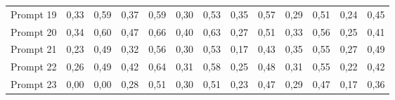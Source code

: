 \begin{tabular}{lrrrrrrrrrrrr}
Prompt 19                                   & 0,33                  & 0,59                    & 0,37                  & 0,59                    & 0,30                  & 0,53                    & 0,35                  & 0,57                    & 0,29                  & 0,51                    & 0,24                  & 0,45                    \\
Prompt 20                                   & 0,34                  & 0,60                    & 0,47                  & 0,66                    & 0,40                  & 0,63                    & 0,27                  & 0,51                    & 0,33                  & 0,56                    & 0,25                  & 0,41                    \\
Prompt 21                                   & 0,23                  & 0,49                    & 0,32                  & 0,56                    & 0,30                  & 0,53                    & 0,17                  & 0,43                    & 0,35                  & 0,55                    & 0,27                  & 0,49                    \\
Prompt 22                                   & 0,26                  & 0,49                    & 0,42                  & 0,64                    & 0,31                  & 0,58                    & 0,25                  & 0,48                    & 0,31                  & 0,55                    & 0,22                  & 0,42                    \\
Prompt 23                                   & 0,00                  & 0,00                    & 0,28                  & 0,51                    & 0,30                  & 0,51                    & 0,23                  & 0,47                    & 0,29                  & 0,47                    & 0,17                  & 0,36                   
\end{tabular}